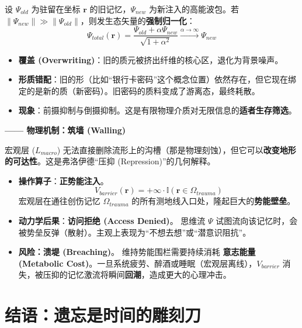 \begin{definition}[置换反应方程]
    设 $\Psi_{old}$ 为驻留在坐标 $\mathbf{r}$ 的旧记忆，$\Psi_{new}$ 为新注入的高能波包。若 $\|\Psi_{new}\| \gg \|\Psi_{old}\|$，则发生态矢量的\textbf{强制归一化}：
    $$ \Psi_{total}(\mathbf{r}) = \frac{\Psi_{old} + \alpha \Psi_{new}}{\sqrt{1 + \alpha^2}} \xrightarrow{\alpha \to \infty} \Psi_{new} $$
\end{definition}

\begin{itemize}
    \item   \textbf{覆盖 (Overwriting)}：旧的质元被挤出纤维的核心区，退化为背景噪声。
    \item   \textbf{形质错配}：旧的形（比如“银行卡密码”这个概念位置）依然存在，但它现在绑定的是新的质（新密码）。旧密码的质料变成了游离态，最终耗散。
    \item   \textbf{现象}：前摄抑制与倒摄抑制。这是有限物理介质对无限信息的\textbf{适者生存筛选}。
\end{itemize}


\textbf{—— 物理机制：筑墙 (Walling)}

宏观层 ($L_{macro}$) 无法直接删除流形上的沟槽（那是物理刻蚀），但它可以\textbf{改变地形的可达性}。这是弗洛伊德“压抑 (Repression)”的几何解释。

\begin{itemize}
    \item   \textbf{操作算子}：\textbf{正势能注入}。
    $$ V_{barrier}(\mathbf{r}) = +\infty \cdot \mathbb{I}(\mathbf{r} \in \Omega_{trauma}) $$
    宏观层在通往创伤记忆 $\Omega_{trauma}$ 的所有测地线入口处，隆起巨大的\textbf{势能壁垒}。

    \item   \textbf{动力学后果}：\textbf{访问拒绝 (Access Denied)}。
    思维流 $\Psi$ 试图流向该记忆时，会被势垒反弹（散射）。主观上表现为“不想去想”或“潜意识阻抗”。

    \item   \textbf{风险：溃堤 (Breaching)}。
    维持势能围栏需要持续消耗 \textbf{意志能量 (Metabolic Cost)}。一旦系统疲劳、醉酒或睡眠（宏观层离线），$V_{barrier}$ 消失，被压抑的记忆激流将瞬间\textbf{回潮}，造成更大的心理冲击。
\end{itemize}

\section{结语：遗忘是时间的雕刻刀}
\label{sec:conclusion_of_forgetting}

